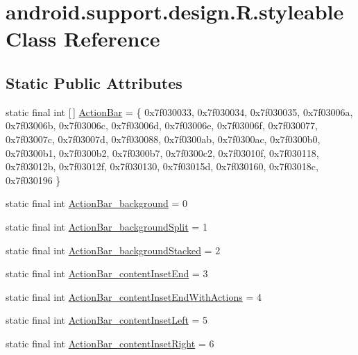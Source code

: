 \hypertarget{classandroid_1_1support_1_1design_1_1_r_1_1styleable}{}\section{android.\+support.\+design.\+R.\+styleable Class Reference}
\label{classandroid_1_1support_1_1design_1_1_r_1_1styleable}
\subsection*{Static Public Attributes}
\begin{DoxyCompactItemize}
\item 
static final int \mbox{[}$\,$\mbox{]} \mbox{\hyperlink{classandroid_1_1support_1_1design_1_1_r_1_1styleable_ab795220a96557d11f8c21359b95bed82}{Action\+Bar}} = \{ 0x7f030033, 0x7f030034, 0x7f030035, 0x7f03006a, 0x7f03006b, 0x7f03006c, 0x7f03006d, 0x7f03006e, 0x7f03006f, 0x7f030077, 0x7f03007c, 0x7f03007d, 0x7f030088, 0x7f0300ab, 0x7f0300ac, 0x7f0300b0, 0x7f0300b1, 0x7f0300b2, 0x7f0300b7, 0x7f0300c2, 0x7f03010f, 0x7f030118, 0x7f03012b, 0x7f03012f, 0x7f030130, 0x7f03015d, 0x7f030160, 0x7f03018c, 0x7f030196 \}
\item 
static final int \mbox{\hyperlink{classandroid_1_1support_1_1design_1_1_r_1_1styleable_a2d07ba50bce7e11b3a849eefb51eb7ea}{Action\+Bar\+\_\+background}} = 0
\item 
static final int \mbox{\hyperlink{classandroid_1_1support_1_1design_1_1_r_1_1styleable_aec14d1bbeebc0fe7cc5a60a04240dccf}{Action\+Bar\+\_\+background\+Split}} = 1
\item 
static final int \mbox{\hyperlink{classandroid_1_1support_1_1design_1_1_r_1_1styleable_a857cc7859cd2386270589f5e83e44ec9}{Action\+Bar\+\_\+background\+Stacked}} = 2
\item 
static final int \mbox{\hyperlink{classandroid_1_1support_1_1design_1_1_r_1_1styleable_a6e5dec3264d2013081f33097dd95df80}{Action\+Bar\+\_\+content\+Inset\+End}} = 3
\item 
static final int \mbox{\hyperlink{classandroid_1_1support_1_1design_1_1_r_1_1styleable_a69a3151064bcf0934094828650e73329}{Action\+Bar\+\_\+content\+Inset\+End\+With\+Actions}} = 4
\item 
static final int \mbox{\hyperlink{classandroid_1_1support_1_1design_1_1_r_1_1styleable_a1aa24ac28fc59081ffcafe4bd8999986}{Action\+Bar\+\_\+content\+Inset\+Left}} = 5
\item 
static final int \mbox{\hyperlink{classandroid_1_1support_1_1design_1_1_r_1_1styleable_a50cd81e727da00403b885bd981f5aac9}{Action\+Bar\+\_\+content\+Inset\+Right}} = 6

\end{DoxyCompactItemize}
